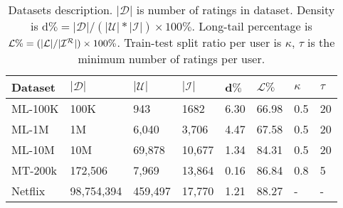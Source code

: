 \begin{table}[t]
\centering
\scriptsize
\begin{tabular}{llllllll}
  \toprule
  {\bf Dataset} & {\bf $|\mathcal{D}|$} & {\bf $|\mathcal{U}|$} & {\bf $|\mathcal{I}|$}  & d$\%$ & $\mathcal{L} \%$ & {\bf $\kappa$} & {\bf $\tau$ } \\ \midrule
  ML-100K  & 100K & 943& 1682  & 6.30 &  66.98   &0.5 & 20 \\
  
  ML-1M   & 1M & 6,040& 3,706 & 4.47 & 67.58  &  0.5 & 20  \\
  
  ML-10M & 10M & 69,878 & 10,677 & 1.34& 84.31  & 0.5 &  20 \\
  
  MT-200k  & 172,506 & 7,969 & 13,864 & 0.16 & 86.84    & 0.8 & 5  \\ 
  
  
  
  Netflix & 98,754,394 &  459,497 & 17,770  &1.21 & 88.27  & -& - \\
   \bottomrule
\end{tabular}
\caption{Datasets description.  $|\mathcal{D}|$ is number of ratings in dataset.  Density is  $ \text{d}\%=  |\mathcal{D}| / ( |\mathcal{U}| * |\mathcal{I}|) \times 100\%$.   Long-tail percentage is  $\mathcal{L}\% = (|\mathcal{L}| / |\mathcal{I}^{\mathcal{R}}|) \times 100\%$. Train-test split ratio per user is $\kappa$,  $\tau$ is the minimum number of ratings per user. }
\label{tab:DatasetStatsticsSmall}
\end{table}




